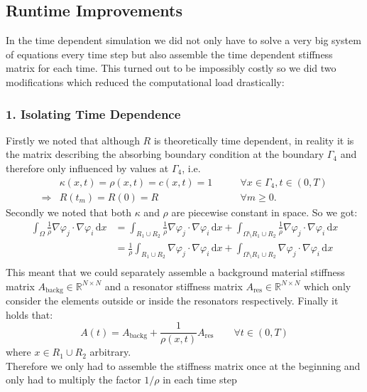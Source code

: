 \documentclass{article}
\begin{document}
\subsection{Runtime Improvements}
In the time dependent simulation we did not only have to solve a very big system of equations every time step but also assemble the time dependent stiffness matrix for each time. This turned out to be impossibly costly so we did two modifications which reduced the computational load drastically: \\
\subsubsection*{1. Isolating Time Dependence}
Firstly we noted that although $R$ is theoretically time dependent, in reality it is the matrix describing the absorbing boundary condition at the boundary $\Gamma_4$ and therefore only influenced by values at $\Gamma_4$, i.e.
\begin{align*}
	&\kappa(x,t) = \rho(x,t) = c(x,t) = 1\qquad &\forall 
	x \in \Gamma_4, t \in (0,T) \\
	\Rightarrow &R(t_m) = R(0) = R \qquad &\forall m\geq 0.
\end{align*}
Secondly we noted that both $\kappa$ and $\rho$ are piecewise constant in space. So we got:
\begin{align*}
 	\int_{\Omega} \frac{1}{\rho} \nabla \varphi_j 
 	\cdot \nabla \varphi_i \,\text{d}x &=
 	\int_{R_1 \cup R_2} \frac{1}{\rho} \nabla \varphi_j 
 	\cdot \nabla \varphi_i \,\text{d}x +
 	\int_{\Omega\setminus R_1 \cup R_2} \frac{1}{\rho} 
 	\nabla \varphi_j 
 	\cdot \nabla \varphi_i \,\text{d}x \\ 	
 	&=
 	\frac{1}{\rho}\int_{R_1 \cup R_2} \nabla \varphi_j 
 	\cdot \nabla \varphi_i \,\text{d}x +
 	\int_{\Omega\setminus R_1 \cup R_2}
 	\nabla \varphi_j 
 	\cdot \nabla \varphi_i \,\text{d}x  	\\
\end{align*}
This meant that we could separately assemble a background material stiffness matrix $A_{\text{backg}}\in \mathbb{R}^{N\times N}$ and a resonator stiffness matrix $A_{\text{res}}\in \mathbb{R}^{N\times N}$ which only consider the elements outside or inside the resonators respectively. Finally it holds that:
\[
	A(t) = A_{\text{backg}} + \frac{1}{\rho (x,t)} A_{\text{res}}
	\qquad \forall t \in (0,T)
\]
where  $x \in R_1  \cup R_2$ arbitrary. \\
Therefore we only had to assemble the stiffness matrix once at the beginning and only had to multiply the factor $1/\rho$ in each time step
\end{document}
